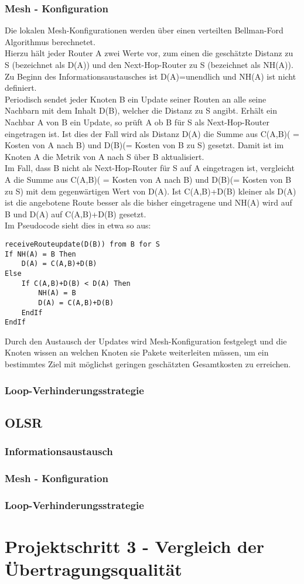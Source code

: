 \documentclass[10pt]{scrartcl}
\begin{document}
\subsubsection{Mesh - Konfiguration}
Die lokalen Mesh-Konfigurationen werden über einen verteilten Bellman-Ford Algorithmus berechnetet.\\
Hierzu hält jeder Router A zwei Werte vor, zum einen die geschätzte Distanz zu S (bezeichnet als D(A)) und den Next-Hop-Router zu S (bezeichnet als NH(A)). Zu Beginn des Informationsaustausches ist D(A)=unendlich und NH(A) ist nicht definiert.\\
Periodisch sendet jeder Knoten B ein Update seiner Routen an alle seine Nachbarn mit dem Inhalt D(B), welcher die Distanz zu S angibt. Erhält ein Nachbar A von B ein Update, so prüft A ob B für S als Next-Hop-Router eingetragen ist. Ist dies der Fall wird als Distanz D(A) die Summe aus C(A,B)( = Kosten von A nach B) und D(B)(= Kosten von B zu S) gesetzt. Damit ist im Knoten A die Metrik von A nach S über B aktualisiert.\\
Im Fall, dass B nicht als Next-Hop-Router für S auf A eingetragen ist, vergleicht A die Summe aus C(A,B)( = Kosten von A nach B) und D(B)(= Kosten von B zu S) mit dem gegenwärtigen Wert von D(A). Ist C(A,B)+D(B) kleiner als D(A) ist die angebotene Route besser als die bisher eingetragene und NH(A) wird auf B und D(A) auf C(A,B)+D(B) gesetzt.\\

Im Pseudocode sieht dies in etwa so aus:
\begin{lstlisting}
receiveRouteupdate(D(B)) from B for S
If NH(A) = B Then
	D(A) = C(A,B)+D(B)
Else
	If C(A,B)+D(B) < D(A) Then
		NH(A) = B
		D(A) = C(A,B)+D(B)
	EndIf
EndIf
\end{lstlisting}

Durch den Austausch der Updates wird Mesh-Konfiguration festgelegt und die Knoten wissen an welchen Knoten sie Pakete weiterleiten müssen, um ein bestimmtes Ziel mit möglichst geringen geschätzten Gesamtkosten zu erreichen.


\subsubsection{Loop-Verhinderungsstrategie}



\subsection{OLSR}
\subsubsection{Informationsaustausch}
\subsubsection{Mesh - Konfiguration}
\subsubsection{Loop-Verhinderungsstrategie}

\section{Projektschritt 3 - Vergleich der Übertragungsqualität}
\end{document}
